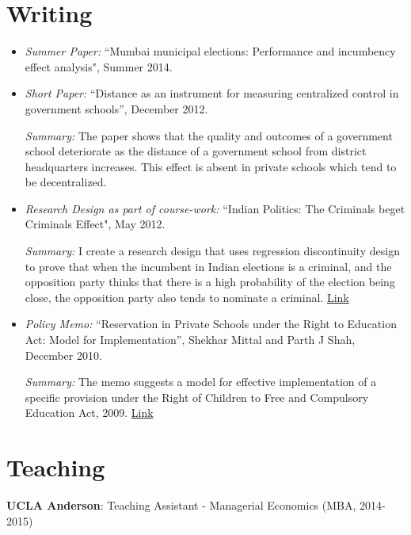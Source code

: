 \documentclass[11pt]{article}
\begin{document}
\section{Writing}
\label{sec-3}
\begin{itemize}
\item \emph{Summer Paper:} ``Mumbai municipal elections: Performance 
and incumbency effect analysis", Summer 2014.

\item \emph{Short Paper:} ``Distance as an instrument for measuring
centralized control in government schools'', December 2012.

\emph{Summary:} The paper shows that the quality and outcomes of a
government school deteriorate as the distance of a government school
from district headquarters increases. This effect is absent in
private schools which tend to be decentralized.

\item \emph{Research Design as part of course-work:} ``Indian Politics: The
Criminals beget Criminals Effect", May 2012.

\emph{Summary:} I create a research design that uses regression
discontinuity design to prove that when the incumbent in Indian
elections is a criminal, and the opposition party thinks that there
is a high probability of the election being close, the opposition
party also tends to nominate a criminal.
\href{http://shekharmittal.info/papers/pe_researchdesign.pdf}{Link}
\end{itemize}


\begin{itemize}
\item \emph{Policy Memo:} ``Reservation in Private Schools under the Right
to Education Act: Model for Implementation'', Shekhar Mittal and
Parth J Shah, December 2010.

\emph{Summary:} The memo suggests a model for effective
implementation of a specific provision under the Right of Children
to Free and Compulsory Education Act, 2009. \href{http://shekharmittal.info/papers/viewpoint10.pdf}{Link}
\end{itemize}

\section{Teaching}
\label{sec-4}
\textbf{UCLA Anderson}: Teaching Assistant - Managerial Economics (MBA, 2014-2015)
\end{document}
